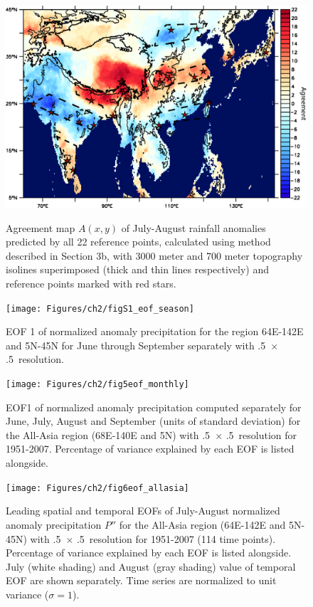 \begin{figure}[t]
\centering
  \noindent\includegraphics[width=36pc,angle=0]{Figures/ch2/fig4agreement}\\
  \caption{Agreement map $A(x,y)$ of July-August rainfall anomalies predicted by all 22 reference points, calculated using method described in Section 3b, with 3000 meter and 700 meter topography isolines superimposed (thick and thin lines respectively) and reference points marked with red stars.}
  \label{fig:f24}
\end{figure}

\begin{figure}[t]
\centering
  \noindent\texttt{[image: Figures/ch2/figS1\_eof\_season]}\\
  \caption{EOF 1 of normalized anomaly precipitation for the region 64E-142E and 5N-45N for June through September separately with .5\textdegree\ $\times$ .5\textdegree\ resolution.}
  \label{fig:S21}
\end{figure}

\begin{figure}[t]
\centering
  \noindent\texttt{[image: Figures/ch2/fig5eof\_monthly]}\\
  \caption{EOF1 of normalized anomaly precipitation computed separately for June, July, August and September (units of standard deviation) for the All-Asia region (68\textdegree E-140\textdegree E and 5\textdegree N) with .5\textdegree\ $\times$ .5\textdegree\ resolution for 1951-2007. Percentage of variance explained by each EOF is listed alongside.}
  \label{fig:f25}
\end{figure}

\begin{figure}[t]
\centering
  \noindent\texttt{[image: Figures/ch2/fig6eof\_allasia]}\\
  \caption{Leading spatial and temporal EOFs of July-August normalized anomaly precipitation $P''$ for the All-Asia region (64\textdegree E-142\textdegree E and 5\textdegree N-45\textdegree N) with .5\textdegree\ $\times$ .5\textdegree\ resolution for 1951-2007 (114 time points). Percentage of variance explained by each EOF is listed alongside. July (white shading) and August (gray shading) value of temporal EOF are shown separately. Time series are normalized to unit variance ($\sigma=1$).}
  \label{fig:f26}
\end{figure}

